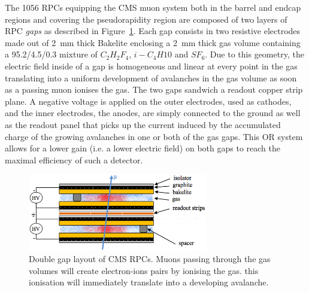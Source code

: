 	The 1056 RPCs equipping the CMS muon system both in the barrel and endcap regions and covering the pseudorapidity region  are composed of two layers of RPC \textit{gaps} as described in Figure~\ref{fig:RPC-DG-layout}. Each gap consists in two resistive electrodes made out of \SI{2}{mm} thick Bakelite enclosing a \SI{2}{mm} thick gas volume containing a 95.2/4.5/0.3 mixture of $C_2H_2F_4$, $i-C_4H10$ and $SF_6$. Due to this geometry, the electric field inside of a gap is homogeneous and linear at every point in the gas translating into a uniform development of avalanches in the gas volume as soon as a passing muon ionises the gas. The two gaps sandwich a readout copper strip plane. A negative voltage is applied on the outer electrodes, used as cathodes, and the inner electrodes, the anodes, are simply connected to the ground as well as the readout panel that picks up the current induced by the accumulated charge of the growing avalanches in one or both of the gas gaps. This OR system allows for a lower gain (i.e. a lower electric field) on both gaps to reach the maximal efficiency of such a detector.
	
	\begin{figure}[H]
		\centering
		\includegraphics[width=0.7\textwidth]{fig/chapt2/RPC_DG_layout.png}
		\caption{\label{fig:RPC-DG-layout} Double gap layout of CMS RPCs. Muons passing through the gas volumes will create electron-ions pairs by ionising the gas. this ionisation will immediately translate into a developing avalanche.}
	\end{figure}

\clearpage{\pagestyle{empty}\cleardoublepage}